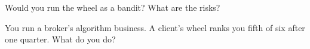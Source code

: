 \begin{interviewq}\label{iq:mx:the-buy-side-trading-desk-and-its-brokers:5}
Would you run the wheel as a bandit? What are the risks?
\end{interviewq}

\begin{interviewq}\label{iq:mx:the-buy-side-trading-desk-and-its-brokers:6}
You run a broker's algorithm business. A client's wheel ranks you fifth of six after one quarter. What do you do?
\end{interviewq}
